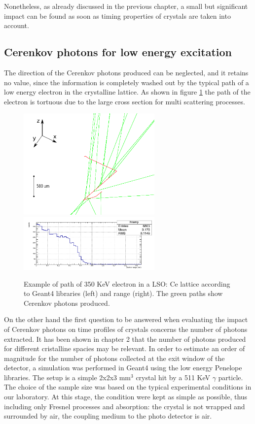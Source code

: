 Nonetheless, as already discussed in the previous chapter, a small but significant impact can be found as soon as timing properties of crystals are taken into account.
\subsection{Cerenkov photons for low energy excitation}
The direction of the Cerenkov photons produced can be neglected, and it retains no value, since the information is completely washed out by the typical path of a low energy electron in the crystalline lattice.
As shown in figure \ref{fig:electron} the path of the electron is tortuous due to the large cross section for multi scattering processes.
\begin{figure}[htbp]
\begin{center}
\includegraphics[width=7cm]{../Pictures/Chapter_5/white.png}
\includegraphics[width=7cm]{../Pictures/Chapter_5/range.png}
\end{center}
\caption[Electron path in lattice]{Example of path of 350 KeV electron in a LSO: Ce lattice according to Geant4 libraries (left) and range (right). The green paths show Cerenkov photons produced.}
\label{fig:electron}
\end{figure}

On the other hand the first question to be answered when evaluating the impact of Cerenkov photons on time profiles of crystals concerns the number of photons extracted.
It has been shown in chapter 2 that the number of photons produced for different cristalline spacies may be relevant. 
In order to estimate an order of magnitude for the number of photons collected at the exit window of the detector, a simulation was performed in Geant4 using the low energy Penelope libraries. The setup is a simple 2x2x3 mm$^{3}$ crystal hit by a 511 KeV $\gamma$ particle. The choice of the sample size was based on the typical experimental conditions in our laboratory. At this stage, the condition were kept as simple as possible, thus including only Fresnel processes and absorption: the crystal is not wrapped and surrounded by air, the coupling medium to the photo detector is air.

